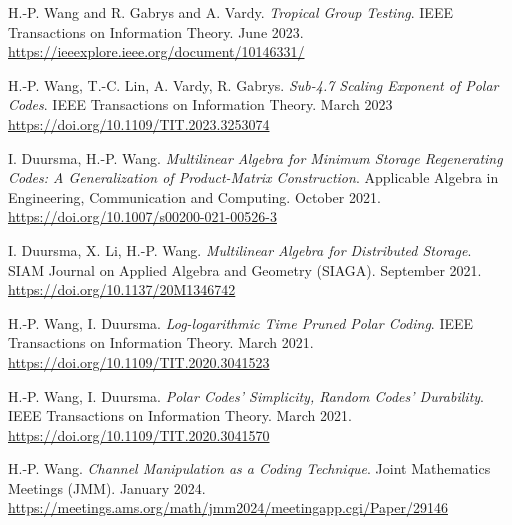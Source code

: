 \documentclass{article}
\def\section#1{$ $\\\textbf{\fs1#1}}
\def\fs#1{%
        \pgfmathsetmacro\a{#1}%
        \pgfmathsetmacro\A{10 * 1.2^\a}%
        \pgfmathsetmacro\B{\A * 1.25}%
        \fontsize{\A pt}{\B pt}\selectfont%
    }
\begin{document}
\bgroup
\def\section#1#2{}
\begin{thebibliography}{9}
    \bibitem{}
    H.-P. Wang and R. Gabrys and A. Vardy.
    \emph{Tropical Group Testing}.
    IEEE Transactions on Information Theory.
    June 2023.
    \url{https://ieeexplore.ieee.org/document/10146331/}

    \bibitem{}
    H.-P. Wang, T.-C. Lin, A. Vardy, R. Gabrys.
    \emph{Sub-4.7 Scaling Exponent of Polar Codes}.
    IEEE Transactions on Information Theory.
    March 2023
    \url{https://doi.org/10.1109/TIT.2023.3253074}

    \bibitem{}
    I. Duursma, H.-P. Wang.
    \emph{Multilinear Algebra for Minimum Storage Regenerating Codes:
        A Generalization of Product-Matrix Construction}.
    Applicable Algebra in Engineering, Communication and Computing.
    October 2021.
    \url{https://doi.org/10.1007/s00200-021-00526-3}

    \bibitem{}
    I. Duursma, X. Li, H.-P. Wang.
    \emph{Multilinear Algebra for Distributed Storage}.
    SIAM Journal on Applied Algebra and Geometry (SIAGA).
    September 2021.
    \url{https://doi.org/10.1137/20M1346742}

    \bibitem{}
    H.-P. Wang, I. Duursma.
    \emph{Log-logarithmic Time Pruned Polar Coding}.
    IEEE Transactions on Information Theory.
    March 2021.
    \url{https://doi.org/10.1109/TIT.2020.3041523}

    \bibitem{}
    H.-P. Wang, I. Duursma.
    \emph{Polar Codes' Simplicity, Random Codes' Durability}.
    IEEE Transactions on Information Theory.
    March 2021.
    \url{https://doi.org/10.1109/TIT.2020.3041570}
\end{thebibliography}
\egroup

\section{Invited Talk}

\bgroup
\def\section#1#2{}
\begin{thebibliography}{9}
    \bibitem{}
    H.-P. Wang.
    \emph{Channel Manipulation as a Coding Technique}.
    Joint Mathematics Meetings (JMM).
    January 2024.
    \url{https://meetings.ams.org/math/jmm2024/meetingapp.cgi/Paper/29146}
\end{thebibliography}
\egroup
\end{document}

